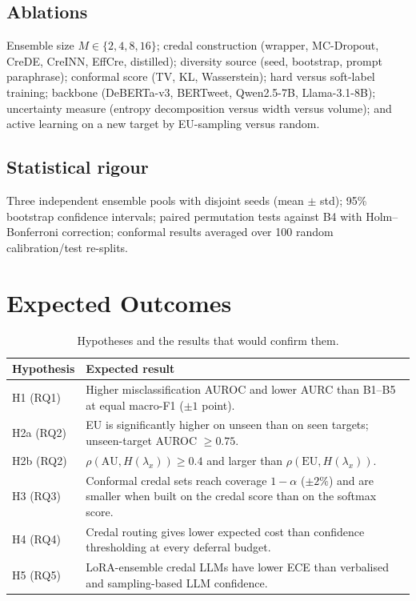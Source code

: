 \documentclass[11pt,a4paper]{article}
\newcommand{\AU}{\mathrm{AU}}
\newcommand{\EU}{\mathrm{EU}}
\begin{document}
\subsection{Ablations}

Ensemble size $M \in \{2,4,8,16\}$; credal construction (wrapper, MC-Dropout, CreDE,
CreINN, EffCre, distilled); diversity source (seed, bootstrap, prompt paraphrase); conformal
score (TV, KL, Wasserstein); hard versus soft-label training; backbone (DeBERTa-v3,
BERTweet, Qwen2.5-7B, Llama-3.1-8B); uncertainty measure (entropy decomposition versus width
versus volume); and active learning on a new target by EU-sampling versus random.

\subsection{Statistical rigour}

Three independent ensemble pools with disjoint seeds (mean $\pm$ std); 95\% bootstrap
confidence intervals; paired permutation tests against B4 with Holm--Bonferroni correction;
conformal results averaged over 100 random calibration/test re-splits.

\section{Expected Outcomes}

\begin{table}[ht]
\centering
\small
\begin{tabular}{l p{10.5cm}}
\toprule
Hypothesis & Expected result \\
\midrule
H1 (RQ1) & Higher misclassification AUROC and lower AURC than B1--B5 at equal macro-F1 ($\pm 1$ point). \\
H2a (RQ2) & EU is significantly higher on unseen than on seen targets; unseen-target AUROC $\ge 0.75$. \\
H2b (RQ2) & $\rho(\AU, H(\lambda_x)) \ge 0.4$ and larger than $\rho(\EU, H(\lambda_x))$. \\
H3 (RQ3) & Conformal credal sets reach coverage $1-\alpha$ ($\pm 2\%$) and are smaller when built on the credal score than on the softmax score. \\
H4 (RQ4) & Credal routing gives lower expected cost than confidence thresholding at every deferral budget. \\
H5 (RQ5) & LoRA-ensemble credal LLMs have lower ECE than verbalised and sampling-based LLM confidence. \\
\bottomrule
\end{tabular}
\caption{Hypotheses and the results that would confirm them.}
\end{table}
\end{document}
